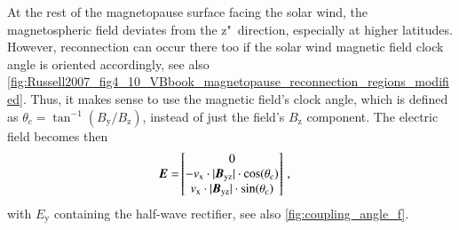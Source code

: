 At the rest of the magnetopause surface facing the solar wind, the magnetospheric field deviates from the z"~direction, especially at higher latitudes. However, reconnection can occur there too if the solar wind magnetic field clock angle is oriented accordingly, see also \autoref{fig:Russell2007_fig4_10_VBbook_magnetopause_reconnection_regions_modified}. Thus, it makes sense to use the magnetic field's clock angle, which is defined as $\theta_c = \tan^{-1}\left(B_\text{y} / B_\text{z}\right)$, instead of just the field's $B_\text{z}$ component. The electric field becomes then
\begin{align}
	\boldsymbol{E} =& \begin{bmatrix}
		0\\
		- v_\text{x} \cdot |\boldsymbol{B_\text{yz}}| \cdot \cos(\theta_c)\\
		v_\text{x} \cdot |\boldsymbol{B_\text{yz}}| \cdot \sin(\theta_c)\\
	\end{bmatrix}	\,,
\end{align}
with $E_\text{y}$ containing the half-wave rectifier, see also \autoref{fig:coupling_angle_f}.




